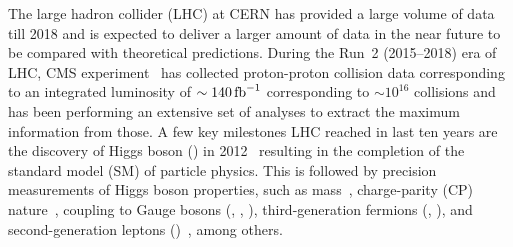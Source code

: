 \documentclass[a4paper,11pt]{article}
\newcommand{\Pb}{{{\Pqb}}\xspace}
\newcommand{\Pt}{{{\Pqt}}\xspace}
\newcommand{\Ps}{{{\Pqs}}\xspace}
\newcommand{\Pc}{{{\Pqc}}\xspace}
\newcommand{\Pd}{{{\Pqd}}\xspace}
\newcommand{\Pu}{{{\Pqu}}\xspace}
\begin{document}
The large hadron collider (LHC) at CERN has provided a large volume of data till 2018
and is expected to deliver a larger amount of data in the near future
to be compared with theoretical predictions. 
During the Run~2 (2015--2018) era of LHC, CMS experiment~\cite{CMS_ex} has collected proton-proton collision data corresponding to an integrated luminosity of $\sim 140\mbox{\ensuremath{\,\text{fb}^{-1}}}$ corresponding to $\sim 10^{16}$ collisions and has been performing an extensive set of analyses to extract the maximum information from those.
A few key milestones LHC reached in last ten years are the discovery of Higgs boson (\PH) in 2012~\cite{Aad:2012tfa,Chatrchyan:2012ufa} resulting in the completion of the standard model (SM) of particle physics. 
This is followed by precision measurements of Higgs boson properties, such as mass~\cite{CMS:2017dib,CMS:2020xrn}, charge-parity (CP) nature~\cite{CMS:2019jdw,CMS:2020cga}, coupling to Gauge bosons (\PW, \PZ, \Pgg), third-generation fermions (\Pb, \Pt), and second-generation leptons (\Pmu)~\cite{CMS-PAS-HIG-19-005}, among others.

\end{document}
